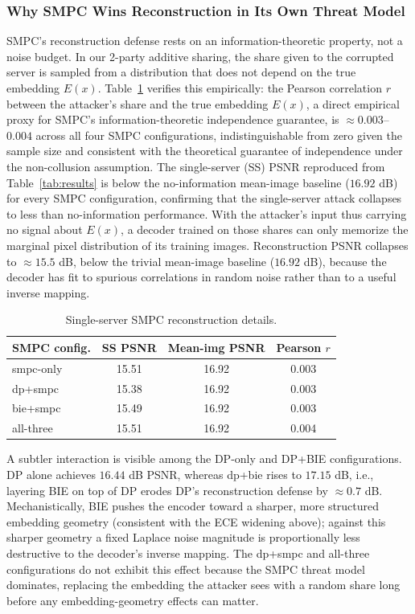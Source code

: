 \documentclass[conference]{IEEEtran}
\begin{document}
\subsubsection{Why SMPC Wins Reconstruction in Its Own Threat Model}
SMPC's reconstruction defense rests on an information-theoretic property, not a noise budget. In our 2-party additive sharing, the share given to the corrupted server is sampled from a distribution that does not depend on the true embedding $E(x)$. Table~\ref{tab:single_server} verifies this empirically: the Pearson correlation $r$ between the attacker's share and the true embedding $E(x)$, a direct empirical proxy for SMPC's information-theoretic independence guarantee, is $\approx 0.003$--$0.004$ across all four SMPC configurations, indistinguishable from zero given the sample size and consistent with the theoretical guarantee of independence under the non-collusion assumption. The single-server (SS) PSNR reproduced from Table~\ref{tab:results} is below the no-information mean-image baseline ($16.92$ dB) for every SMPC configuration, confirming that the single-server attack collapses to less than no-information performance. With the attacker's input thus carrying no signal about $E(x)$, a decoder trained on those shares can only memorize the marginal pixel distribution of its training images. Reconstruction PSNR collapses to $\approx 15.5$ dB,  {below} the trivial mean-image baseline ($16.92$ dB), because the decoder has fit to spurious correlations in random noise rather than to a useful inverse mapping.

\begin{table}[htbp]
\caption{Single-server SMPC reconstruction details.}
\label{tab:single_server}
\centering
\renewcommand{\arraystretch}{1.15}
\begin{tabular}{lccc}
\toprule
\textbf{SMPC config.} & \textbf{SS PSNR} & \textbf{Mean-img PSNR} & \textbf{Pearson $r$} \\
\midrule
smpc-only  & 15.51 & 16.92 & 0.003 \\
dp+smpc    & 15.38 & 16.92 & 0.003 \\
bie+smpc   & 15.49 & 16.92 & 0.003 \\
all-three  & 15.51 & 16.92 & 0.004 \\
\bottomrule
\end{tabular}
\end{table}

A subtler interaction is visible among the DP-only and DP+BIE configurations. DP alone achieves $16.44$ dB PSNR, whereas dp+bie rises to $17.15$ dB, i.e., {layering BIE on top of DP erodes DP's reconstruction defense} by $\approx 0.7$ dB. Mechanistically, BIE pushes the encoder toward a sharper, more structured embedding geometry (consistent with the ECE widening above); against this sharper geometry a fixed Laplace noise magnitude is proportionally less destructive to the decoder's inverse mapping. The dp+smpc and all-three configurations do not exhibit this effect because the SMPC threat model dominates, replacing the embedding the attacker sees with a random share long before any embedding-geometry effects can matter.
\end{document}
